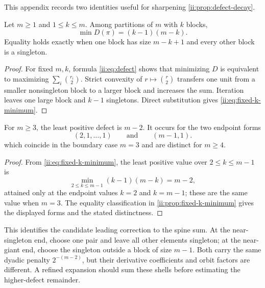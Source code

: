 This appendix records two identities useful for sharpening
\cref{ii:prop:defect-decay}.

\begin{proposition}
\label{ii:prop:fixed-k-minimum}
Let $m\ge1$ and $1\le k\le m$.  Among partitions of $m$ with $k$ blocks,
\begin{equation}
 \min D(\pi)=(k-1)(m-k).
 \label{ii:eq:fixed-k-minimum}
\end{equation}
Equality holds exactly when one block has size $m-k+1$ and every other block is a
singleton.
\end{proposition}

\begin{proof}
For fixed $m,k$, formula \eqref{ii:eq:defect} shows that minimizing $D$ is equivalent to
maximizing $\sum_i\binom{r_i}{2}$.  Strict convexity of $r\mapsto\binom r2$ transfers
one unit from a smaller nonsingleton block to a larger block and increases the sum.
Iteration leaves one large block and $k-1$ singletons.  Direct substitution gives
\eqref{ii:eq:fixed-k-minimum}.
\end{proof}

\begin{proposition}
\label{ii:prop:first-shell}
For $m\geq3$, the least positive defect is $m-2$.  It occurs for the two
endpoint forms
\begin{equation}
 (2,1,\ldots,1)
 \qquad\text{and}\qquad
 (m-1,1).
 \label{ii:eq:first-shell}
\end{equation}
which coincide in the boundary case $m=3$ and are distinct for $m\ge4$.
\end{proposition}

\begin{proof}
From \eqref{ii:eq:fixed-k-minimum}, the least positive value over $2\leq k\leq m-1$ is
\[
 \min_{2\leq k\leq m-1}(k-1)(m-k)=m-2,
\]
attained only at the endpoint values $k=2$ and $k=m-1$; these are the same
value when $m=3$.  The equality classification in
\cref{ii:prop:fixed-k-minimum} gives the displayed forms and the stated
distinctness.
\end{proof}

This identifies the candidate leading correction to the spine sum.  At the
near-singleton end, choose one pair and leave all other elements singleton; at the
near-giant end, choose the singleton outside a block of size $m-1$.  Both carry the
same dyadic penalty $2^{-(m-2)}$, but their derivative coefficients and orbit factors
are different.  A refined expansion should sum these shells before estimating the
higher-defect remainder.
